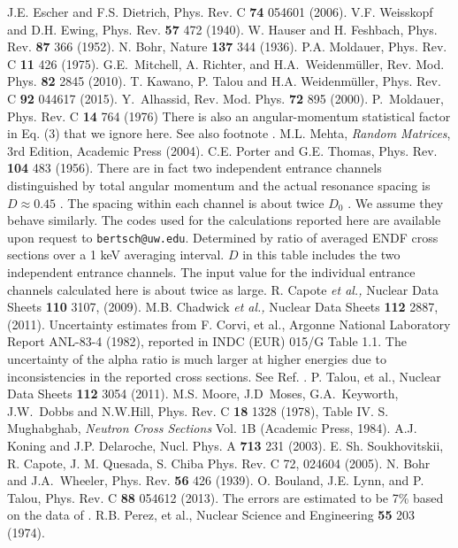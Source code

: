 \documentclass[prl,aps,floatfix,nofootinbib,preprint]{revtex4}
\begin{document}
\begin{thebibliography}{99}
 J.E. Escher and F.S. Dietrich, Phys. Rev. C {\bf74} 054601
(2006).
 V.F. Weisskopf and D.H. Ewing, Phys. Rev. {\bf 57} 472
(1940).
 W. Hauser and H. Feshbach, Phys. Rev. {\bf 87} 366 (1952).
N. Bohr, Nature {\bf 137} 344 (1936).
 P.A. Moldauer, Phys. Rev. C {\bf 11} 426 (1975).
 G.E.~Mitchell, A. Richter, and H.A.~Weidenm\"uller, 
Rev. Mod. Phys. {\bf 82} 2845 (2010).
 T. Kawano, P. Talou and H.A. Weidenm\"uller, Phys. Rev.
C {\bf 92} 044617 (2015).
 Y.~Alhassid, Rev. Mod. Phys. {\bf 72} 895 (2000).
 P.~Moldauer, Phys. Rev. C {\bf 14} 764 (1976)
 There is also an angular-momentum statistical factor
in Eq. (3) that we ignore here.  See also footnote \cite{Js}.
 { M.L. Mehta, {\it Random Matrices}, 3rd Edition,  Academic Press (2004).}
 C.E. Porter and G.E. Thomas, Phys. Rev. {\bf 104} 483 (1956).
 There are in fact
two independent entrance channels distinguished by total angular momentum and the
actual resonance spacing is $D\approx 0.45$ \cite{ripl}. The spacing within each channel
is about twice $D_0$ \cite{mo78}.  We assume they behave similarly. 
 The codes used for the calculations reported here are
available upon request to {\tt bertsch@uw.edu}.
 Determined by ratio of averaged ENDF cross sections
over a 1 keV averaging interval.
 $D$ in this table includes the two independent entrance
channels. The input value for the individual entrance channels calculated 
here is about twice as large.
 { R. Capote {\it et al.,} Nuclear Data Sheets {\bf 110} 3107, (2009).}
 { M.B. Chadwick {\it et al.,} Nuclear Data Sheets {\bf 112} 2887, (2011).}
  Uncertainty estimates from F. Corvi, et al., Argonne
National Laboratory Report ANL-83-4 (1982), reported in INDC (EUR) 015/G
Table 1.1.
 The uncertainty of the alpha ratio is much larger at higher
energies due to inconsistencies in the reported cross sections.  See
Ref. \cite{ta11}.
 P. Talou, et al., Nuclear Data Sheets {\bf 112} 3054 (2011).
 M.S. Moore, J.D~Moses, G.A.~Keyworth, J.W.~Dobbs and
N.W.Hill, Phys. Rev. C {\bf 18} 1328 (1978), Table IV.
 S. Mughabghab, {\it Neutron Cross Sections} Vol. 1B
(Academic Press, 1984).
 A.J. Koning and J.P. Delaroche, Nucl. Phys. A {\bf 713}
231 (2003). 
 E. Sh. Soukhovitskii, R. Capote, J. M. Quesada, 
   S. Chiba Phys. Rev. C 72, 024604 (2005).
 N. Bohr and J.A.~Wheeler, Phys. Rev. {\bf 56} 426 (1939).
 { O. Bouland, J.E. Lynn, and P. Talou, Phys. Rev. C {\bf 88} 054612 (2013).}
 The errors are estimated to be 7\% based on the data of
\cite{pe74}.
  R.B. Perez, et al., Nuclear Science and Engineering {\bf 55}
203 (1974).
\end{thebibliography}
%
%
\end{document}
